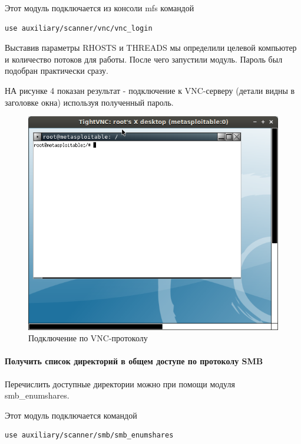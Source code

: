 Этот модуль подключается из консоли mfs командой

\begin{Verbatim}[frame=single]
use auxiliary/scanner/vnc/vnc_login
\end{Verbatim}

Выставив параметры RHOSTS и THREADS мы определили целевой компьютер и количество потоков для работы. После чего запустили модуль. Пароль был подобран практически сразу.

НА рисунке 4 показан результат - подключение к VNC-серверу (детали видны в заголовке окна) используя полученный пароль.

\begin{figure}[h!]
\centering
\includegraphics[scale=0.8]{res/pic04}
\caption{Подключение по VNC-протоколу}
\end{figure}

\paragraph{Получить список директорий в общем доступе по протоколу SMB}

Перечислить доступные директории можно при помощи модуля smb\_enumshares.

Этот модуль подключается командой

\begin{Verbatim}[frame=single]
use auxiliary/scanner/smb/smb_enumshares
\end{Verbatim}

